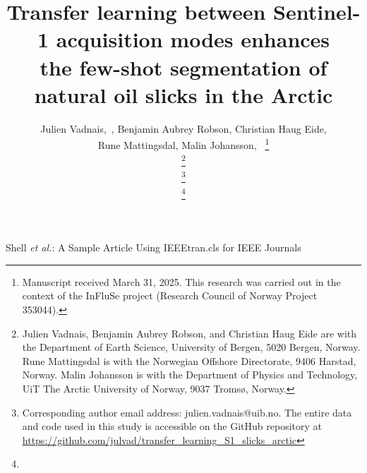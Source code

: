 \documentclass[lettersize,journal]{IEEEtran}
\begin{document}
\title{Transfer learning between Sentinel-1 acquisition modes enhances \\ the few-shot segmentation of natural oil slicks in the Arctic}

\author{
    Julien Vadnais,~, 
    Benjamin Aubrey Robson, 
    Christian Haug Eide, \\
    Rune Mattingsdal, 
    Malin Johansson,~ 
\thanks{Manuscript received March 31, 2025. This research was carried out in the context of the InFluSe project (Research Council of Norway Project 353044).}

\thanks{Julien Vadnais, Benjamin Aubrey Robson, and Christian Haug Eide are with the Department of Earth Science, University of Bergen, 5020 Bergen, Norway.
Rune Mattingsdal is with the Norwegian Offshore Directorate, 9406 Harstad, Norway.
Malin Johansson is with the Department of Physics and Technology, UiT The Arctic University of Norway, 9037 Tromsø, Norway.} 

\thanks{Corresponding author email address: julien.vadnais@uib.no. The entire data and code used in this study is accessible on the GitHub repository at \\ 
\url{https://github.com/julvad/transfer_learning_S1_slicks_arctic}}
 
\thanks{}%
}

%
{Shell \MakeLowercase{\textit{et al.}}: A Sample Article Using IEEEtran.cls for IEEE Journals}

\end{document}
